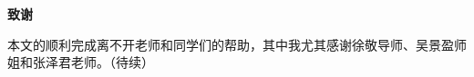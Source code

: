 \clearpage
\begin{center}
    \bfseries {} 致谢
\end{center}

本文的顺利完成离不开老师和同学们的帮助，其中我尤其感谢徐敬导师、吴景盈师姐和张泽君老师。（待续）

